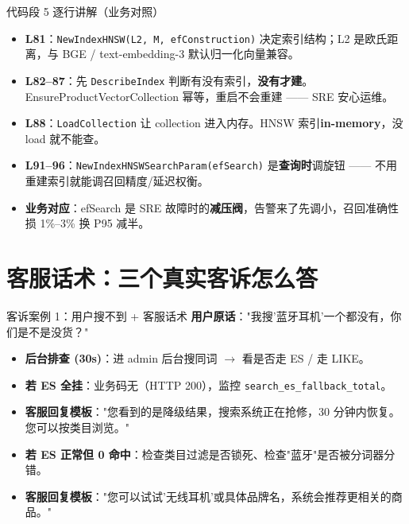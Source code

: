 \documentclass[aspectratio=169,11pt]{beamer}
\begin{document}
\begin{frame}[shrink]{代码段 5 逐行讲解（业务对照）}
\begin{itemize}
  \item \textbf{L81}：\texttt{NewIndexHNSW(L2, M, efConstruction)} 决定索引结构；L2 是欧氏距离，与 BGE / text-embedding-3 默认归一化向量兼容。
  \item \textbf{L82--87}：先 \texttt{DescribeIndex} 判断有没有索引，\textbf{没有才建}。EnsureProductVectorCollection 幂等，重启不会重建 —— SRE 安心运维。
  \item \textbf{L88}：\texttt{LoadCollection} 让 collection 进入内存。HNSW 索引\textbf{in-memory}，没 load 就不能查。
  \item \textbf{L91--96}：\texttt{NewIndexHNSWSearchParam(efSearch)} 是\textbf{查询时}调旋钮 —— 不用重建索引就能调召回精度/延迟权衡。
  \item \textbf{业务对应}：efSearch 是 SRE 故障时的\textbf{减压阀}，告警来了先调小，召回准确性损 1\%--3\% 换 P95 减半。
\end{itemize}
\end{frame}

\section{客服话术：三个真实客诉怎么答}

\begin{frame}[shrink]{客诉案例 1：用户搜不到 + 客服话术}
\textbf{用户原话}："我搜'蓝牙耳机'一个都没有，你们是不是没货？"
\vspace{2mm}
\begin{itemize}
  \item \textbf{后台排查 (30s)}：进 admin 后台搜同词 $\to$ 看是否走 ES / 走 LIKE。
  \item \textbf{若 ES 全挂}：业务码无（HTTP 200），监控 \texttt{search\_es\_fallback\_total}。
  \item \textbf{客服回复模板}："您看到的是降级结果，搜索系统正在抢修，30 分钟内恢复。您可以按类目浏览。"
  \item \textbf{若 ES 正常但 0 命中}：检查类目过滤是否锁死、检查"蓝牙"是否被分词器分错。
  \item \textbf{客服回复模板}："您可以试试'无线耳机'或具体品牌名，系统会推荐更相关的商品。"
\end{itemize}
\end{frame}
\end{document}
